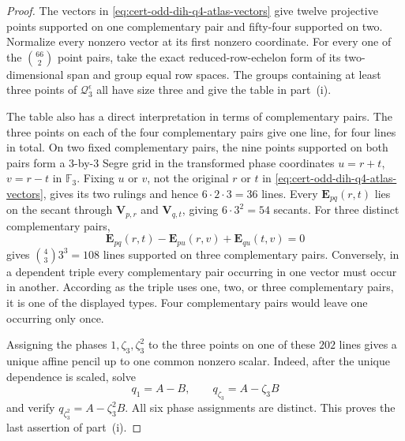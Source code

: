\documentclass[11pt,letterpaper,onecolumn]{article}
\theoremstyle{plain}
\theoremstyle{definition}
\theoremstyle{remark}
\begin{document}
	\begin{proof}
		The vectors in \cref{eq:cert-odd-dih-q4-atlas-vectors} give twelve
		projective points supported on one complementary pair and fifty-four supported on two.  Normalize every
		nonzero vector at its first nonzero coordinate.  For every one of the
		\(\binom{66}{2}\) point pairs, take the exact reduced-row-echelon form of
		its two-dimensional span and group equal row spaces.  The groups containing
		at least three points of \(\mathcal Q_3^\epsilon\) all have size three and give the table in
		part~\textnormal{(i)}.
		
		The table also has a direct interpretation in terms of complementary pairs.  The three points on each of the four complementary pairs give one line, for four lines in total.  On two fixed complementary pairs, the nine
		points supported on both pairs form a \(3\)-by-\(3\) Segre grid in the transformed
		phase coordinates \(u=r+t\), \(v=r-t\) in \(\mathbb F_3\).
		Fixing \(u\) or \(v\), not the original \(r\) or \(t\) in
		\cref{eq:cert-odd-dih-q4-atlas-vectors}, gives its two rulings and hence
		\(6\cdot2\cdot3=36\) lines.  Every \({\mathbf E}_{pq}(r,t)\) lies on the secant
		through \({\mathbf V}_{p,r}\) and \({\mathbf V}_{q,t}\), giving \(6\cdot3^2=54\) secants.
		For three distinct complementary pairs,
		\[
		{\mathbf E}_{pq}(r,t)-{\mathbf E}_{pu}(r,v)+{\mathbf E}_{qu}(t,v)=0
		\]
		gives \(\binom43 3^3=108\) lines supported on three complementary pairs.  Conversely, in a dependent
		triple every complementary pair occurring in one vector must occur in another.  According
		as the triple uses one, two, or three complementary pairs, it is one of the displayed
		types. Four complementary pairs would leave one occurring only once.
		
		Assigning the phases \(1,\zeta_3,\zeta_3^2\) to the three points on one of these \(202\) lines gives a
		unique affine pencil up to one common nonzero scalar.  Indeed,
		after the unique dependence is scaled, solve
		\[
		q_1=A-B,\qquad q_{\zeta_3}=A-\zeta_3 B
		\]
		and verify \(q_{\zeta_3^2}=A-\zeta_3^2B\).  All six phase assignments are
		distinct.  This proves the last assertion of part~\textnormal{(i)}.
		

\end{proof}
\end{document}
